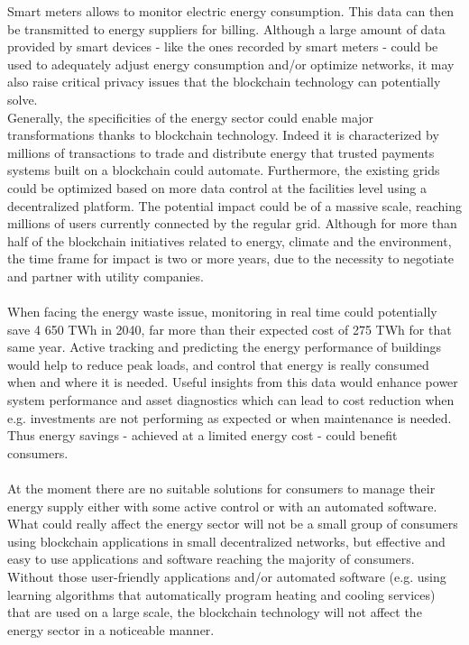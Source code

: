 \documentclass[11pt]{article}
\begin{document}
Smart meters allows to monitor electric energy consumption. This data can then be transmitted to energy suppliers for billing. Although a large amount of data provided by smart devices - like the ones recorded by smart meters - could be used to adequately adjust energy consumption and/or optimize networks, it may also raise critical privacy issues \cite{4} that the blockchain technology can potentially solve.\\
Generally, the specificities of the energy sector could enable major transformations thanks to blockchain technology. Indeed it is characterized by millions of transactions to trade and distribute energy that trusted payments systems built on a blockchain could automate. Furthermore, the existing grids could be optimized based on more data control at the facilities level using a decentralized platform. The potential impact could be of a massive scale, reaching millions of users currently connected by the regular grid. Although for more than half of the blockchain initiatives related to energy, climate and the environment, the time frame for impact is two or more years, due to the necessity to negotiate and partner with utility companies.\cite{5}\\\\
When facing the energy waste issue, monitoring in real time could potentially save 4 650 TWh in 2040, far more than their expected cost of 275 TWh for that same year. Active tracking and predicting the energy performance of buildings would help to reduce peak loads, and control that energy is really consumed when and where it is needed. Useful insights from this data would enhance power system performance and asset diagnostics which can lead to cost reduction when e.g. investments are not performing as expected or when maintenance is needed. Thus energy savings - achieved at a limited energy cost - could benefit consumers.\cite{6}\\\\
At the moment there are no suitable solutions for consumers to manage their energy supply either with some active control or with an automated software. What could really affect the energy sector will not be a small group of consumers using blockchain applications in small decentralized networks, but effective and easy to use applications and software reaching the majority of consumers. Without those user-friendly applications and/or automated software (e.g. using learning algorithms that automatically program heating and cooling services) that are used on a large scale, the blockchain technology will not affect the energy sector in a noticeable manner.\cite{7}\\\\
\end{document}
